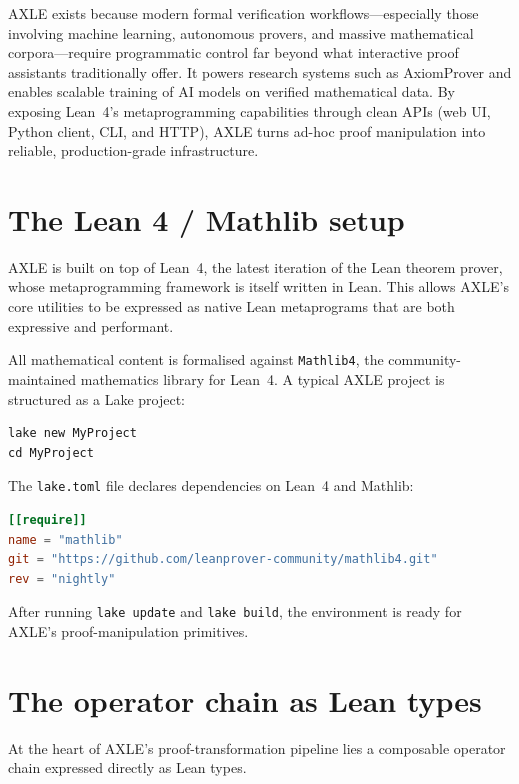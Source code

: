 AXLE exists because modern formal verification workflows---especially those involving machine learning, autonomous provers, and massive mathematical corpora---require programmatic control far beyond what interactive proof assistants traditionally offer. It powers research systems such as AxiomProver and enables scalable training of AI models on verified mathematical data. By exposing Lean~4's metaprogramming capabilities through clean APIs (web UI, Python client, CLI, and HTTP), AXLE turns ad-hoc proof manipulation into reliable, production-grade infrastructure.

\section{The Lean 4 / Mathlib setup}

AXLE is built on top of Lean~4, the latest iteration of the Lean theorem prover, whose metaprogramming framework is itself written in Lean. This allows AXLE's core utilities to be expressed as native Lean metaprograms that are both expressive and performant.

All mathematical content is formalised against \texttt{Mathlib4}, the community-maintained mathematics library for Lean~4. A typical AXLE project is structured as a Lake project:

\begin{verbatim}
lake new MyProject
cd MyProject
\end{verbatim}

The \texttt{lake.toml} file declares dependencies on Lean~4 and Mathlib:

\begin{lstlisting}[language=Toml]
[[require]]
name = "mathlib"
git = "https://github.com/leanprover-community/mathlib4.git"
rev = "nightly"
\end{lstlisting}

After running \texttt{lake update} and \texttt{lake build}, the environment is ready for AXLE's proof-manipulation primitives.

\section{The operator chain as Lean types}

At the heart of AXLE's proof-transformation pipeline lies a composable operator chain expressed directly as Lean types.


